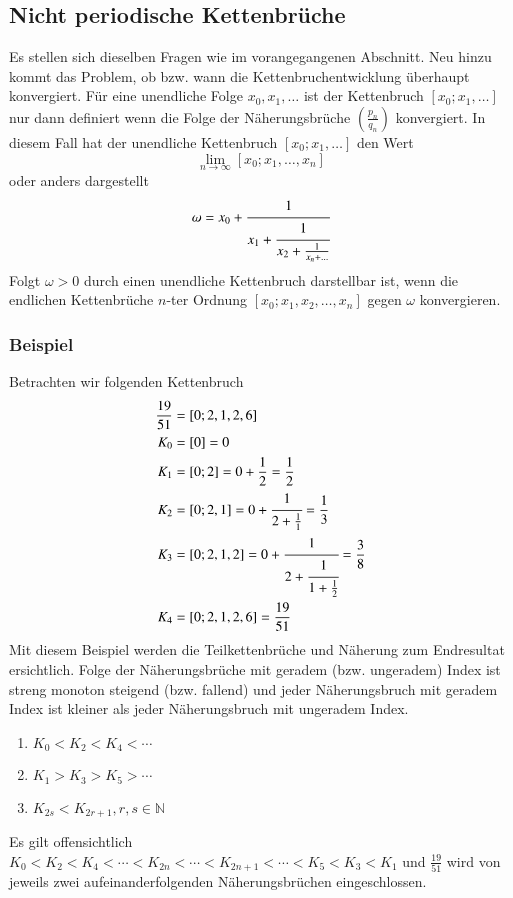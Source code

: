 \subsection{Nicht periodische Kettenbrüche}
Es stellen sich dieselben Fragen wie im vorangegangenen Abschnitt.
Neu hinzu kommt das Problem, ob bzw. wann die Kettenbruchentwicklung
überhaupt konvergiert.
Für eine unendliche Folge $x_0,x_1,\dots$ ist der Kettenbruch
$[x_0;x_1,\dots]$ nur dann definiert wenn die Folge der Näherungsbrüche
$(\frac{p_n}{q_n})$ konvergiert. In diesem Fall hat der unendliche
Kettenbruch $[x_0;x_1,\dots]$ den Wert
\begin{equation}
\lim_{n\to\infty} [x_0;x_1,\dots,x_n]
\end{equation}
oder anders dargestellt
\begin{equation}
\omega
=
x_0 + \cfrac{1}{x_1+\cfrac{1}{x_2+\frac{1}{x_n+\dots}}}
\end{equation}
Folgt $\omega > 0$ durch einen unendliche Kettenbruch darstellbar
ist, wenn die endlichen Kettenbrüche $n$-ter Ordnung
$[x_0;x_1,x_2,\dots,x_n]$ gegen $\omega$ konvergieren.

\subsubsection{Beispiel}
\begin{beispiel}
Betrachten wir folgenden Kettenbruch
\begin{align*}
\frac{19}{51} &= [0;2,1,2,6]
\\
	K_0 &= [0] = 0
\\
	K_1 &= [0;2] = 0 + \frac{1}{2} = \frac{1}{2}
\\
	K_2 &= [0;2,1] = 0 + \cfrac{1}{2+\frac{1}{1}} = \frac{1}{3}
\\
	K_3 &= [0;2,1,2] = 0 + \cfrac{1}{2+\cfrac{1}{1+\frac{1}{2}}} = \frac{3}{8}
\\
	K_4 &= [0;2,1,2,6] = \frac{19}{51}
\end{align*}
Mit diesem Beispiel werden die Teilkettenbrüche und Näherung zum Endresultat ersichtlich.
Folge der Näherungsbrüche mit geradem (bzw. ungeradem) Index
ist streng monoton steigend (bzw. fallend) und jeder Näherungsbruch
mit geradem Index ist kleiner als jeder Näherungsbruch mit ungeradem Index.
\begin{enumerate}
\item
$K_0 < K_2 < K_4 < \cdots$
\item
$K_1 > K_3 > K_5 > \cdots$
\item
$K_{2s} < K_{2r+1}, r,s \in \mathbb{N}$
\end{enumerate}

Es gilt offensichtlich
$K_0 < K_2 < K_4 < \cdots < K_{2n} < \cdots < K_{2n+1} < \cdots < K_5
< K_3 < K_1$
und $\frac{19}{51}$ wird von jeweils zwei aufeinanderfolgenden
Näherungsbrüchen eingeschlossen.
\end{beispiel}

